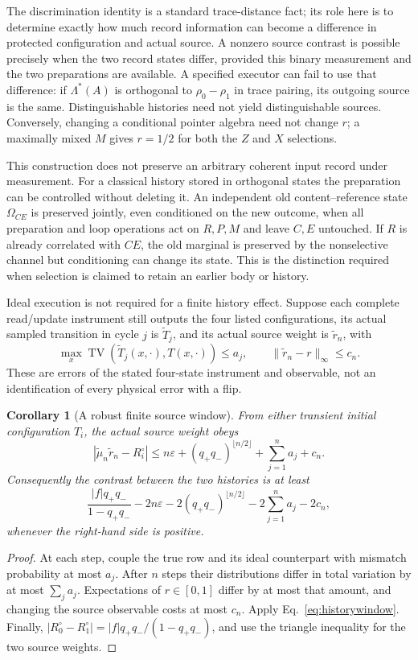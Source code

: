 \documentclass[12pt,a4paper]{article}
\newtheorem{corollary}[theorem]{Corollary}
\begin{document}
The discrimination identity is a standard trace-distance fact; its role here is to determine exactly how much record information can become a difference in protected configuration and actual source. A nonzero source contrast is possible precisely when the two record states differ, provided this binary measurement and the two preparations are available. A specified executor can fail to use that difference: if $\Lambda^*(A)$ is orthogonal to $\rho_0-\rho_1$ in trace pairing, its outgoing source is the same. Distinguishable histories need not yield distinguishable sources. Conversely, changing a conditional pointer algebra need not change $r$; a maximally mixed $M$ gives $r=1/2$ for both the $Z$ and $X$ selections.

This construction does not preserve an arbitrary coherent input record under measurement. For a classical history stored in orthogonal states the preparation can be controlled without deleting it. An independent old content--reference state $\Omega_{CE}$ is preserved jointly, even conditioned on the new outcome, when all preparation and loop operations act on $R,P,M$ and leave $C,E$ untouched. If $R$ is already correlated with $CE$, the old marginal is preserved by the nonselective channel but conditioning can change its state. This is the distinction required when selection is claimed to retain an earlier body or history.

Ideal execution is not required for a finite history effect. Suppose each complete read/update instrument still outputs the four listed configurations, its actual sampled transition in cycle $j$ is $\widetilde T_j$, and its actual source weight is $\widetilde r_n$, with
\[
 \max_x\operatorname{TV}(\widetilde T_j(x,\cdot),T(x,\cdot))\le a_j,
 \qquad \|\widetilde r_n-r\|_\infty\le c_n .
\]
These are errors of the stated four-state instrument and observable, not an identification of every physical error with a flip.

\begin{corollary}[A robust finite source window]
\label{cor:robustwindow}
From either transient initial configuration $T_i$, the actual source weight obeys
\[
 |\widetilde\mu_n\widetilde r_n-R_i^\circ|
 \le n\varepsilon+(q_+q_-)^{\lfloor n/2\rfloor}
                   +\sum_{j=1}^n a_j+c_n .
\]
Consequently the contrast between the two histories is at least
\[
 \frac{|f|q_+q_-}{1-q_+q_-}
 -2n\varepsilon-2(q_+q_-)^{\lfloor n/2\rfloor}
 -2\sum_{j=1}^n a_j-2c_n ,
\]
whenever the right-hand side is positive.
\end{corollary}
\begin{proof}
At each step, couple the true row and its ideal counterpart with mismatch probability at most $a_j$. After $n$ steps their distributions differ in total variation by at most $\sum_j a_j$. Expectations of $r\in[0,1]$ differ by at most that amount, and changing the source observable costs at most $c_n$. Apply Eq.~\eqref{eq:historywindow}. Finally,
$|R_0^\circ-R_1^\circ|=|f|q_+q_-/(1-q_+q_-)$, and use the triangle inequality for the two source weights.
\end{proof}
\end{document}

